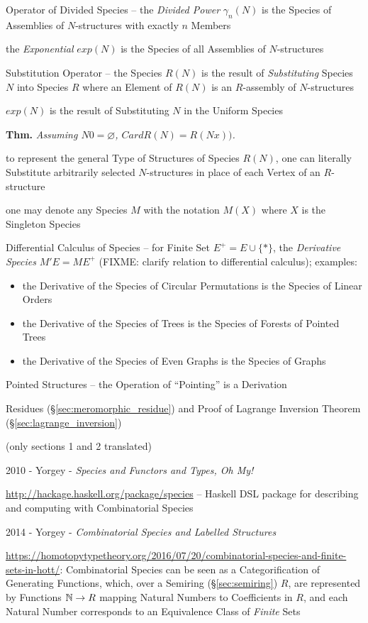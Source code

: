 Operator of Divided Species -- the \emph{Divided Power} $\gamma_n(N)$ is the
Species of Assemblies of $N$-structures with exactly $n$ Members

the \emph{Exponential} $exp(N)$ is the Species of all Assemblies of
$N$-structures

Substitution Operator -- the Species $R(N)$ is the result of \emph{Substituting}
Species $N$ into Species $R$ where an Element of $R(N)$ is an $R$-assembly of
$N$-structures

$exp(N)$ is the result of Substituting $N$ in the Uniform Species

\textbf{Thm.} \emph{Assuming $N 0 = \varnothing$, $Card R(N) = R(N x))$.}

to represent the general Type of Structures of Species $R(N)$, one can literally
Substitute arbitrarily selected $N$-structures in place of each Vertex of an
$R$-structure

one may denote any Species $M$ with the notation $M(X)$ where $X$ is the
Singleton Species

Differential Calculus of Species -- for Finite Set $E^+ = E \cup \{*\}$, the
\emph{Derivative Species} $M' E = M E^+$
(FIXME: clarify relation to differential calculus); examples:
\begin{itemize}
  \item the Derivative of the Species of Circular Permutations is the Species of
    Linear Orders
  \item the Derivative of the Species of Trees is the Species of Forests of
    Pointed Trees
  \item the Derivative of the Species of Even Graphs is the Species of Graphs
\end{itemize}

Pointed Structures -- the Operation of ``Pointing'' is a Derivation

Residues (\S\ref{sec:meromorphic_residue}) and Proof of Lagrange Inversion
Theorem (\S\ref{sec:lagrange_inversion})

(only sections 1 and 2 translated)

2010 - Yorgey - \emph{Species and Functors and Types, Oh My!}

\url{http://hackage.haskell.org/package/species} -- Haskell DSL package for
describing and computing with Combinatorial Species

2014 - Yorgey - \emph{Combinatorial Species and Labelled Structures}

\url{https://homotopytypetheory.org/2016/07/20/combinatorial-species-and-finite-sets-in-hott/}:
Combinatorial Species can be seen as a Categorification of Generating Functions,
which, over a Semiring (\S\ref{sec:semiring}) $R$, are represented by Functions
$\mathbb{N} \rightarrow R$ mapping Natural Numbers to Coefficients in $R$, and each
Natural Number corresponds to an Equivalence Class of \emph{Finite} Sets



